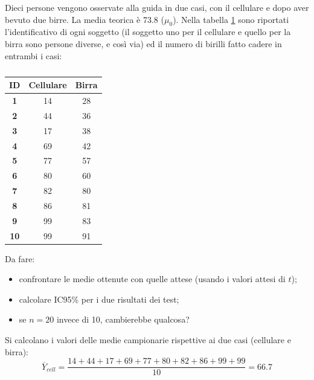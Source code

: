 \documentclass[10pt, draft]{book}
\newcounter{example}[section]
\begin{document}
\begin{example}\label{esguida}
    Dieci persone vengono osservate alla guida in due casi, con il cellulare e dopo aver bevuto due birre. La media teorica è 73.8 ($\mu_0$). Nella tabella \ref{tabguida} sono riportati l'identificativo di ogni soggetto (il soggetto uno per il cellulare e quello per la birra sono persone diverse, e così via) ed il numero di birilli fatto cadere in entrambi i casi:
    \begin{table}[H]
        \centering
        \renewcommand\arraystretch{1.2}
        \begin{tabular}{c|c|c}
        \hline
        \textbf{ID}& \textbf{Cellulare} & \textbf{Birra}\\
        \hline
        \textbf{1} & 14 & 28\\
        \hline
        \textbf{2} & 44 & 36\\
        \hline
        \textbf{3} & 17 & 38\\
        \hline
        \textbf{4} & 69 & 42\\
        \hline
        \textbf{5} & 77 & 57\\
        \hline
        \textbf{6} & 80 & 60\\
        \hline
        \textbf{7} & 82 & 80\\
        \hline
        \textbf{8} & 86 & 81\\
        \hline
        \textbf{9} & 99 & 83\\
        \hline
        \textbf{10} & 99 & 91\\
        \hline
        \end{tabular}
        \caption{\small{}}
        \label{tabguida}
    \end{table}\noindent
    Da fare:
    \begin{itemize}
        \item confrontare le medie ottenute con quelle attese (usando i valori attesi di $t$);
        \item calcolare IC95\% per i due risultati dei test;
        \item se $n = 20$ invece di 10, cambierebbe qualcosa?
    \end{itemize}
    Si calcolano i valori delle medie campionarie rispettive ai due casi (cellulare e birra):
    \begin{equation}
        \overline{Y}_{cell} = \frac{14+44+17+69+77+80+82+86+99+99}{10} = 66.7
    \end{equation}
    \begin{equation}

\end{equation}
\end{example}
\end{document}
